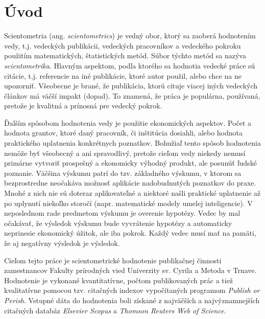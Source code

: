 \chapter*{Úvod}

Scientometria (ang. {\em scientometrics}) je vedný obor, ktorý sa zaoberá
hodnotením vedy, t.j. vedeckých publikácii, vedeckých pracovníkov a vedeckého
pokroku použitím matematických, štatistických metód.  Súbor týchto metód sa
nazýva {\em scientometrika}.  Hlavným aspektom, podľa ktorého sa hodnotia
vedecké práce sú citácie, t.j. referencie na iné publikácie, ktoré autor použil,
alebo chce na ne upozorniť.  Všeobecne je brané, že publikácia, ktorú cituje
viacej iných vedeckých článkov má väčší impakt (dopad).  To znamená, že práca je
populárna, používaná, pretože je kvalitná a prínosná pre vedecký pokrok.


Ďalším spôsobom hodnotenia vedy je použitie ekonomických aspektov.  Počet a
hodnota grantov, ktoré daný pracovník, či inštitúcia dosiahli, alebo hodnota
praktického uplatnenia konkrétnych poznatkov.  Bohužiaľ tento spôsob hodnotenia
nemôže byť všeobecný a ani spravodlivý, pretože cieľom vedy niekedy nemusí
primárne vytvoriť prospešný a ekonomicky výhodný produkt, ale posunúť ľudské
poznanie.  Väčšina výskumu patrí do tzv.  základného výskumu, v ktorom sa
bezprostredne neočakáva možnosť aplikácie nadobudnutých poznatkov do
praxe. Mnohé z nich nie sú doteraz aplikovateľné a niektoré našli praktické
uplatnenie až po uplynutí niekoľko storočí (napr. matematické modely umelej
inteligencie).  V neposlednom rade predmetom výskumu je overenie hypotézy.
Vedec by mal očakávať, že výsledok výskumu bude vyvrátenie hypotézy a
automaticky neprinesie ekonomický úžitok, ale iba pokrok.  Každý vedec musí mať
na pamäti, že aj negatívny výsledok je výsledok.

Cieľom tejto práce je scientometrické hodnotenie publikačnej činnosti
zamestnancov Fakulty prírodných vied Univerzity sv. Cyrila a Metoda v Trnave.
Hodnotenie je vykonané kvantitatívne, počtom publikovaných prác a tiež
kvalitatívne pomocou tzv. citačných indexov vypočítaných programom {\em Publish
  or Perish}.  Vstupné dáta do hodnotenia boli získané z najväčších a
najvýznamnejších citačných databáz {\em Elsevier Scopus} a {\em Thomson Reuters
  Web of Science}.

